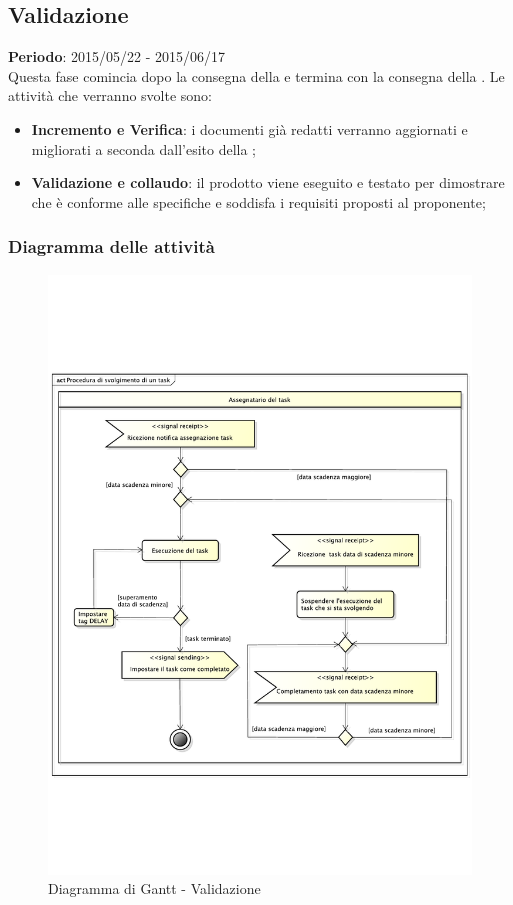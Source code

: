	\subsection{Validazione} %
	\label{sub:validazione}
	\textbf{Periodo}:  2015/05/22 - 2015/06/17 \\
	Questa fase comincia dopo la consegna della \RQ{} e termina con la consegna della \RA.
	Le attività che verranno svolte sono:
		\begin{itemize}
			\item \textbf{Incremento e Verifica}: i documenti già redatti verranno aggiornati e migliorati a seconda dall'esito della \RQ;
			\item \textbf{Validazione e collaudo}: il prodotto viene eseguito e testato per dimostrare che è conforme alle specifiche e soddisfa i requisiti proposti al proponente;
		\end{itemize}
		
		\subsubsection{Diagramma delle attività} %
		\label{ssub:diagramma_delle_attivita}
			\begin{figure}[htbp]
				\centering
				\includegraphics[width=14cm]{images/proc_svolgimento_task.pdf}
				\caption{Diagramma di Gantt - Validazione}
				\label{fig:gantt_validazione}				
			\end{figure}
	
	
